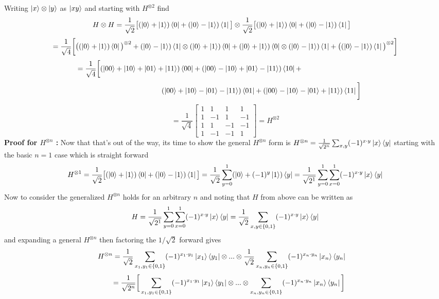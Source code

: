 \documentclass[12pt]{exam}
\begin{document}
\begin{solution}
    Writing $\ket{x}\otimes \ket{y}$ as $\ket{xy}$ and starting with $H^{\otimes 2}$ find $$
    H\otimes H = \frac{1}{\sqrt{2}} \big[(\ket{0}+ \ket{1})\bra{0} + (\ket{0}-\ket{1})\bra{1}\big] \otimes \frac{1}{\sqrt{2}} \big[(\ket{0}+ \ket{1})\bra{0} + (\ket{0}-\ket{1})\bra{1}\big] \quad $$
    $$= \frac{1}{\sqrt{4}}\bigg[ \big((\ket{0}+ \ket{1})\bra{0}\big)^{\otimes2} + (\ket{0}-\ket{1})\bra{1}\otimes(\ket{0}+ \ket{1})\bra{0} + (\ket{0}+\ket{1})\bra{0}\otimes(\ket{0}- \ket{1})\bra{1} + \big((\ket{0}-\ket{1})\bra{1}\big)^{\otimes2}\bigg]
    $$ $$
    = \frac{1}{\sqrt{4}}\bigg[ (\ket{00}+ \ket{10}+\ket{01} +\ket{11})\bra{00} +
    (\ket{00}-\ket{10} +\ket{01}-\ket{11})\bra{10} +
    \hspace{100pt} $$ $$ \hspace{100pt}
    (\ket{00}+\ket{10} -\ket{01}-\ket{11})\bra{01} +
    (\ket{00}-\ket{10} -\ket{01}+\ket{11})\bra{11} \bigg]$$
    $$= \frac{1}{\sqrt{4}}\begin{bmatrix} 
        1 & 1 & 1 & 1 \\ 
        1 & -1 & 1 & -1  \\ 
        1 & 1 & -1 & -1 \\
        1 & -1 & -1 & 1 \end{bmatrix} = H^{\otimes 2} $$
    \textbf{Proof for $H^{\otimes n}$ : }Now that that's out of the way, its time to show the general $H^{\otimes n}$ form is 
    $
    H^{\otimes n} = \frac{1}{\sqrt{2^n}}\sum_{x,y}(-1)^{x\cdot y}\ket{x}\bra{y}$ starting with the basic $n=1$ case which is straight forward 
    $$
    H^{\otimes 1} = \frac{1}{\sqrt{2}} \big[(\ket{0}+ \ket{1})\bra{0} + (\ket{0}-\ket{1})\bra{1}\big] = \frac{1}{\sqrt{2}} \sum_{y=0}^1(\ket{0}+ (-1)^y\ket{1})\bra{y}
    =\frac{1}{\sqrt{2^1}} \sum_{y=0}^1\sum_{x=0}^1(-1)^{x\cdot y}\ket{x}\bra{y}$$
    Now to consider the generalized $H^{\otimes n}$ holds for an arbitrary $n$ and noting that $H$ from above can be written as $$H = \frac{1}{\sqrt{2^1}} \sum_{y=0}^1\sum_{x=0}^1(-1)^{x\cdot y}\ket{x}\bra{y} = \frac{1}{\sqrt{2}} \sum_{x,y\in\{0,1\}}(-1)^{x\cdot y}\ket{x}\bra{y}$$
    and expanding a general $H^{\otimes n}$ then factoring the $1/\sqrt{2}$ forward gives
    $$
    H^{\otimes n} = \frac{1}{\sqrt{2}} \sum_{x_1,y_1\in\{0,1\}}(-1)^{x_1\cdot y_1}\ket{x_1}\bra{y_1} \otimes ... \otimes \frac{1}{\sqrt{2}} \sum_{x_n,y_n\in\{0,1\}}(-1)^{x_n\cdot y_n}\ket{x_n}\bra{y_n} 
    \quad $$ $$ \quad
    = \frac{1}{\sqrt{2^n}} \bigg[\sum_{x_1,y_1\in\{0,1\}}(-1)^{x_1\cdot y_1}\ket{x_1}\bra{y_1} \otimes ... \otimes  \sum_{x_n,y_n\in\{0,1\}}(-1)^{x_n\cdot y_n}\ket{x_n}\bra{y_n}\bigg]
$$
\end{solution}
\end{document}
